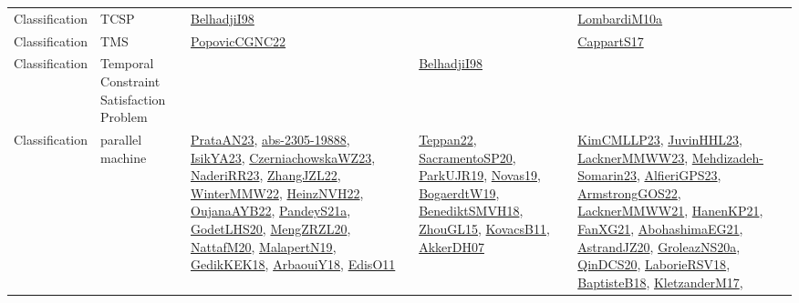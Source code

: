 {\begin{longtable}{lp{3cm}>{\raggedright}p{6cm}>{\raggedright}p{6cm}p{8cm}}
Classification & TCSP & \href{articles/BelhadjiI98.pdf}{BelhadjiI98}\cite{BelhadjiI98} &  & \href{articles/LombardiM10a.pdf}{LombardiM10a}\cite{LombardiM10a}\\
Classification & TMS & \href{papers/PopovicCGNC22.pdf}{PopovicCGNC22}\cite{PopovicCGNC22} &  & \href{papers/CappartS17.pdf}{CappartS17}\cite{CappartS17}\\
Classification & Temporal Constraint Satisfaction Problem &  & \href{articles/BelhadjiI98.pdf}{BelhadjiI98}\cite{BelhadjiI98} & \\
Classification & parallel machine & \href{articles/PrataAN23.pdf}{PrataAN23}\cite{PrataAN23}, \href{articles/abs-2305-19888.pdf}{abs-2305-19888}\cite{abs-2305-19888}, \href{articles/IsikYA23.pdf}{IsikYA23}\cite{IsikYA23}, \href{articles/CzerniachowskaWZ23.pdf}{CzerniachowskaWZ23}\cite{CzerniachowskaWZ23}, \href{articles/NaderiRR23.pdf}{NaderiRR23}\cite{NaderiRR23}, \href{papers/ZhangJZL22.pdf}{ZhangJZL22}\cite{ZhangJZL22}, \href{papers/WinterMMW22.pdf}{WinterMMW22}\cite{WinterMMW22}, \href{articles/HeinzNVH22.pdf}{HeinzNVH22}\cite{HeinzNVH22}, \href{papers/OujanaAYB22.pdf}{OujanaAYB22}\cite{OujanaAYB22}, \href{articles/PandeyS21a.pdf}{PandeyS21a}\cite{PandeyS21a}, \href{papers/GodetLHS20.pdf}{GodetLHS20}\cite{GodetLHS20}, \href{articles/MengZRZL20.pdf}{MengZRZL20}\cite{MengZRZL20}, \href{papers/NattafM20.pdf}{NattafM20}\cite{NattafM20}, \href{papers/MalapertN19.pdf}{MalapertN19}\cite{MalapertN19}, \href{articles/GedikKEK18.pdf}{GedikKEK18}\cite{GedikKEK18}, \href{papers/ArbaouiY18.pdf}{ArbaouiY18}\cite{ArbaouiY18}, \href{papers/EdisO11.pdf}{EdisO11}\cite{EdisO11} & \href{papers/Teppan22.pdf}{Teppan22}\cite{Teppan22}, \href{articles/SacramentoSP20.pdf}{SacramentoSP20}\cite{SacramentoSP20}, \href{papers/ParkUJR19.pdf}{ParkUJR19}\cite{ParkUJR19}, \href{articles/Novas19.pdf}{Novas19}\cite{Novas19}, \href{papers/BogaerdtW19.pdf}{BogaerdtW19}\cite{BogaerdtW19}, \href{papers/BenediktSMVH18.pdf}{BenediktSMVH18}\cite{BenediktSMVH18}, \href{papers/ZhouGL15.pdf}{ZhouGL15}\cite{ZhouGL15}, \href{articles/KovacsB11.pdf}{KovacsB11}\cite{KovacsB11}, \href{papers/AkkerDH07.pdf}{AkkerDH07}\cite{AkkerDH07} & \href{papers/KimCMLLP23.pdf}{KimCMLLP23}\cite{KimCMLLP23}, \href{papers/JuvinHHL23.pdf}{JuvinHHL23}\cite{JuvinHHL23}, \href{articles/LacknerMMWW23.pdf}{LacknerMMWW23}\cite{LacknerMMWW23}, \href{papers/Mehdizadeh-Somarin23.pdf}{Mehdizadeh-Somarin23}\cite{Mehdizadeh-Somarin23}, \href{articles/AlfieriGPS23.pdf}{AlfieriGPS23}\cite{AlfieriGPS23}, \href{papers/ArmstrongGOS22.pdf}{ArmstrongGOS22}\cite{ArmstrongGOS22}, \href{papers/LacknerMMWW21.pdf}{LacknerMMWW21}\cite{LacknerMMWW21}, \href{papers/HanenKP21.pdf}{HanenKP21}\cite{HanenKP21}, \href{articles/FanXG21.pdf}{FanXG21}\cite{FanXG21}, \href{articles/AbohashimaEG21.pdf}{AbohashimaEG21}\cite{AbohashimaEG21}, \href{articles/AstrandJZ20.pdf}{AstrandJZ20}\cite{AstrandJZ20}, \href{papers/GroleazNS20a.pdf}{GroleazNS20a}\cite{GroleazNS20a}, \href{articles/QinDCS20.pdf}{QinDCS20}\cite{QinDCS20}, \href{articles/LaborieRSV18.pdf}{LaborieRSV18}\cite{LaborieRSV18}, \href{articles/BaptisteB18.pdf}{BaptisteB18}\cite{BaptisteB18}, \href{papers/KletzanderM17.pdf}{KletzanderM17}\cite{KletzanderM17}, 
\end{longtable}}
